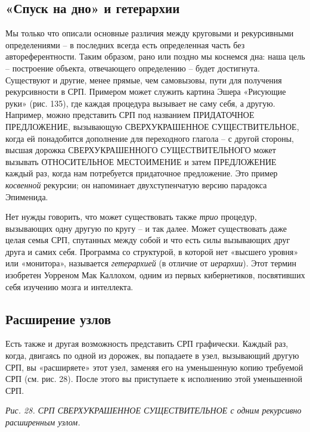 \documentclass[../main.tex]{subfiles}
\begin{document}
\subsection{«Спуск на дно» и гетерархии}

Мы только что описали основные различия между круговыми и рекурсивными определениями \--- в последних всегда есть определенная часть без автореферентности. Таким образом, рано или поздно мы коснемся дна: наша цель \--- построение объекта, отвечающего определению \--- будет достигнута. Существуют и другие, менее прямые, чем самовызовы, пути для получения рекурсивности в СРП\@. Примером может служить картина Эшера «Рисующие руки» (рис. 135), где каждая процедура вызывает не саму себя, а другую. Например, можно представить СРП под названием ПРИДАТОЧНОЕ ПРЕДЛОЖЕНИЕ, вызывающую СВЕРХУКРАШЕННОЕ СУЩЕСТВИТЕЛЬНОЕ, когда ей понадобится дополнение для переходного глагола \--- с другой стороны, высшая дорожка СВЕРХУКРАШЕННОГО СУЩЕСТВИТЕЛЬНОГО может вызывать ОТНОСИТЕЛЬНОЕ МЕСТОИМЕНИЕ и затем ПРЕДЛОЖЕНИЕ каждый раз, когда нам потребуется придаточное предложение. Это пример \emph{косвенной} рекурсии; он напоминает двухступенчатую версию парадокса Эпименида.

Нет нужды говорить, что может существовать также \emph{трио} процедур, вызывающих одну другую по кругу \--- и так далее. Может существовать даже целая семья СРП, спутанных между собой и что есть силы вызывающих друг друга и самих себя. Программа со структурой, в которой нет «высшего уровня» или «монитора», называется \emph{гетерархией} (в отличие от \emph{иерархии}). Этот термин изобретен Уорреном Мак Каллохом, одним из первых кибернетиков, посвятивших себя изучению мозга и интеллекта.


\subsection{Расширение узлов}

Есть также и другая возможность представить СРП графически. Каждый раз, когда, двигаясь по одной из дорожек, вы попадаете в узел, вызывающий другую СРП, вы «расширяете» этот узел, заменяя его на уменьшенную копию требуемой СРП (см. рис. 28). После этого вы приступаете к исполнению этой уменьшенной СРП\@.

\emph{Рис. 28. СРП СВЕРХУКРАШЕННОЕ СУЩЕСТВИТЕЛЬНОЕ с одним рекурсивно расширенным узлом.}
\end{document}
